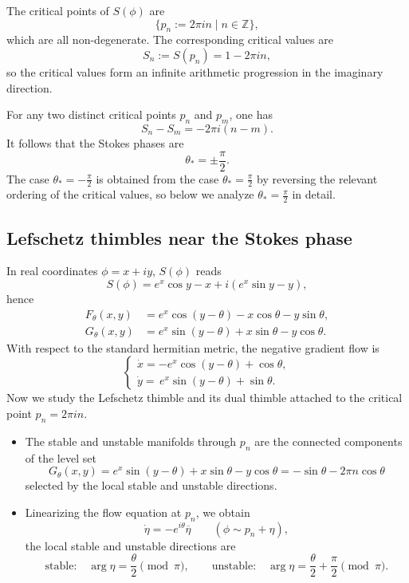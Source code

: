 \documentclass[11pt]{amsart}
\theoremstyle{plain}
\newcommand{\Z}{\mathbb Z}
\begin{document}
The critical points of  $S(\phi)$ are
\[\{p_n:=2\pi i n\mid n\in\Z\}, \]
which are all non-degenerate. The corresponding critical values are
\[
S_n:=S(p_n)=1-2\pi i n,
\]
so the critical values form an infinite arithmetic progression in the imaginary direction.

For any two distinct critical points \(p_n\) and \(p_m\), one has
\[
S_n-S_m=-2\pi i(n-m).
\]
It follows that the Stokes phases are
\[
\theta_*=\pm\frac{\pi}{2}.
\]
The case \(\theta_*=-\frac{\pi}{2}\) is obtained from the case
\(\theta_*=\frac{\pi}{2}\) by reversing the relevant ordering of the critical values, so below we analyze \(\theta_*=\frac{\pi}{2}\) in detail.

\smallskip
\subsection{Lefschetz thimbles near the Stokes phase}
In real coordinates $\phi=x+iy$, $S(\phi)$ reads
\[
S(\phi)=e^x\cos y-x+i(e^x\sin y-y),
\]
hence
\begin{equation*}\label{eq:Gamma-FG}
\begin{aligned}
F_\theta(x,y)&=e^x\cos(y-\theta)-x\cos\theta-y\sin\theta,\\
G_\theta(x,y)&=e^x\sin(y-\theta)+x\sin\theta-y\cos\theta.
\end{aligned}    
\end{equation*}
With respect to the standard hermitian metric, the negative gradient flow is
\begin{equation*}\label{eq:gamma-flow-real-general}
\begin{cases}
\dot x=-e^x\cos(y-\theta)+\cos\theta,
\\[0.1cm]
\dot y=\,e^x\sin(y-\theta)+\sin\theta.
\end{cases}
\end{equation*}
Now we study the Lefschetz thimble and its dual thimble attached to the critical point \(p_n=2\pi i n\). 
\begin{itemize}
\item The stable and unstable manifolds through \(p_n\) are the connected components of the level set
\begin{equation*}\label{eq:gamma-critical-level-generic}
G_\theta(x,y)=e^x\sin(y-\theta)+x\sin\theta-y\cos\theta=-\sin\theta-2\pi n\cos\theta
\end{equation*}
selected by the local stable and unstable directions. 
\item Linearizing the flow equation at $p_n$, we obtain
\[
\dot\eta=-e^{i\theta}\overline{\eta}
\qquad
(\phi\sim p_n+\eta),
\]
the local stable and unstable directions are
\begin{equation*}\label{eq:gamma-local-directions}
\text{stable:} \quad \arg\eta=\frac{\theta}{2}\pmod{\pi},
\qquad 
\text{unstable:} \quad  \arg\eta=\frac{\theta}{2}+\frac{\pi}{2}\pmod{\pi}.
\end{equation*}
\end{itemize}
\end{document}
